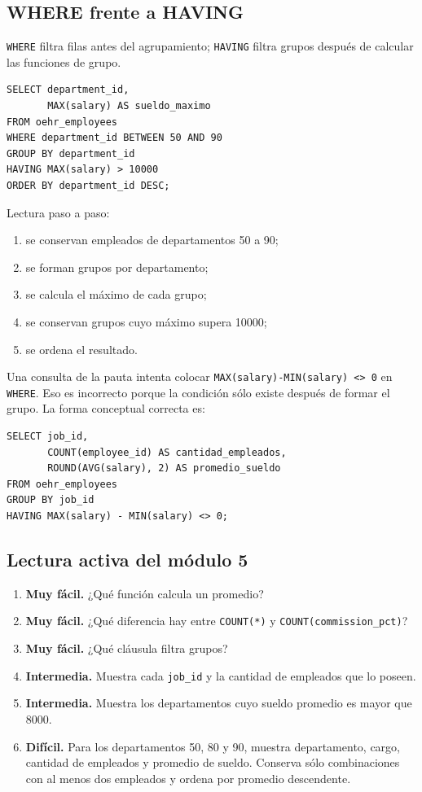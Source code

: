 \documentclass[11pt,a4paper]{article}
\newcommand{\campo}[1]{\texttt{#1}}
\newcommand{\nivel}[1]{\textbf{#1}}
\begin{document}
\subsection{WHERE frente a HAVING}

\campo{WHERE} filtra filas antes del agrupamiento; \campo{HAVING} filtra grupos después de calcular
las funciones de grupo.

\begin{lstlisting}
SELECT department_id,
       MAX(salary) AS sueldo_maximo
FROM oehr_employees
WHERE department_id BETWEEN 50 AND 90
GROUP BY department_id
HAVING MAX(salary) > 10000
ORDER BY department_id DESC;
\end{lstlisting}

Lectura paso a paso:

\begin{enumerate}
  \item se conservan empleados de departamentos 50 a 90;
  \item se forman grupos por departamento;
  \item se calcula el máximo de cada grupo;
  \item se conservan grupos cuyo máximo supera 10000;
  \item se ordena el resultado.
\end{enumerate}

\begin{prueba}
Una consulta de la pauta intenta colocar \campo{MAX(salary)-MIN(salary) <> 0} en \campo{WHERE}. Eso es
incorrecto porque la condición sólo existe después de formar el grupo. La forma conceptual correcta
es:
\begin{lstlisting}
SELECT job_id,
       COUNT(employee_id) AS cantidad_empleados,
       ROUND(AVG(salary), 2) AS promedio_sueldo
FROM oehr_employees
GROUP BY job_id
HAVING MAX(salary) - MIN(salary) <> 0;
\end{lstlisting}
\end{prueba}

\subsection{Lectura activa del módulo 5}

\begin{enumerate}[label=\textbf{M5.\arabic*}]
  \item \nivel{Muy fácil.} ¿Qué función calcula un promedio?
  \item \nivel{Muy fácil.} ¿Qué diferencia hay entre \campo{COUNT(*)} y
  \campo{COUNT(commission\_pct)}?
  \item \nivel{Muy fácil.} ¿Qué cláusula filtra grupos?
  \item \nivel{Intermedia.} Muestra cada \campo{job\_id} y la cantidad de empleados que lo poseen.
  \item \nivel{Intermedia.} Muestra los departamentos cuyo sueldo promedio es mayor que 8000.
  \item \nivel{Difícil.} Para los departamentos 50, 80 y 90, muestra departamento, cargo, cantidad
  de empleados y promedio de sueldo. Conserva sólo combinaciones con al menos dos empleados y ordena
  por promedio descendente.
\end{enumerate}
\end{document}
